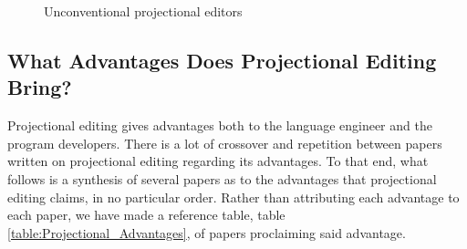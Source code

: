 \begin{figure}
    \begin{center}
        
        \caption{Unconventional projectional editors}
    \label{fig:leftfield}
    \end{center}
\end{figure}

\subsection{What Advantages Does Projectional Editing Bring?}
\label{section:projectional_advantages}

Projectional editing gives advantages both to the language engineer and the program developers.
There is a lot of crossover and repetition between papers written on projectional editing regarding its advantages.
To that end, what follows is a synthesis of several papers as to the advantages that projectional editing claims, in no particular order.
Rather than attributing each advantage to each paper, we have made a reference table, table \ref{table:Projectional_Advantages}, of papers proclaiming said advantage. 
 
